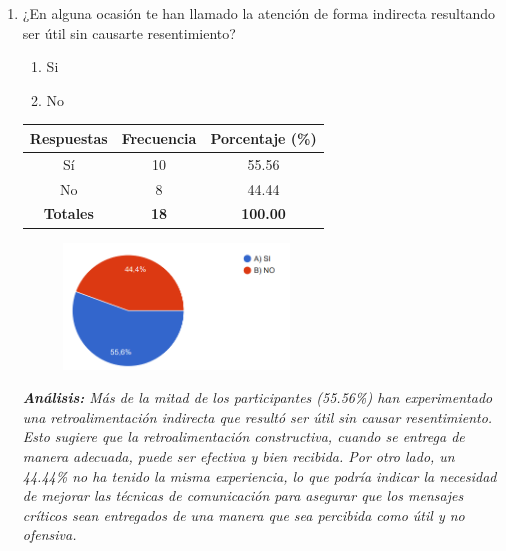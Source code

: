 \documentclass[journal]{IEEEtran}
\begin{document}
\begin{enumerate}
	\item ¿En alguna ocasión te han llamado la atención de forma indirecta resultando ser útil sin causarte resentimiento?
	\begin{enumerate}
		\item Si
		\item No
	\end{enumerate}
	\begin{table}[H]
		\renewcommand{\arraystretch}{1.3}
		\centering
		\begin{tabular}{|c|c|c|}
			\hline
			\textbf{Respuestas} & \textbf{Frecuencia} & \textbf{Porcentaje (\%)}\\
			\hline
			Sí & 10 & 55.56\\
			No & 8 & 44.44\\
			\hline
			\textbf{Totales} &\textbf{18}& \textbf{100.00}\\
			\hline
		\end{tabular}
	\end{table}
	\begin{figure}[h]
		\centering
		\includegraphics[width=06cm]{Pregunta19}
	\end{figure}
	\textit{\textbf{Análisis:} Más de la mitad de los participantes (55.56\%) han experimentado una retroalimentación indirecta que resultó ser útil sin causar resentimiento. Esto sugiere que la retroalimentación constructiva, cuando se entrega de manera adecuada, puede ser efectiva y bien recibida. Por otro lado, un 44.44\% no ha tenido la misma experiencia, lo que podría indicar la necesidad de mejorar las técnicas de comunicación para asegurar que los mensajes críticos sean entregados de una manera que sea percibida como útil y no ofensiva.}\\
	

\end{enumerate}
\end{document}
